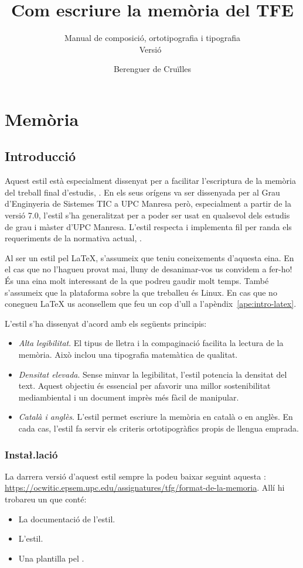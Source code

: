 \documentclass{tfgitic}
\title{
  Com escriure la memòria del TFE
}
\subtitle{
  Manual de composició, ortotipografia i tipografia\\
  Versió~\classversion{}
}
\author{Berenguer de Cruïlles}
\begin{document}
\part{Memòria}

\chapter{Introducció}
\label{cap:intro}

Aquest estil està especialment dissenyat per a facilitar l'escriptura de
la memòria del treball final d'estudis, . En els seus
orígens va ser dissenyada per al Grau d'Enginyeria de Sistemes TIC a
UPC Manresa però, especialment a partir de la versió 7.0, l'estil s'ha
generalitzat per a poder ser usat en qualsevol dels estudis de grau i
màster d'UPC Manresa. L'estil respecta i implementa fil per randa els
requeriments de la normativa actual,
\cite{manresa23:_normat_trebal_fi_estud_epsem}.

Al ser un estil pel \LaTeX{}, s'assumeix que teniu coneixements
d'aquesta eina. En el cas que no l'hagueu provat mai, lluny de
desanimar-vos us convidem a fer-ho!  És una eina molt interessant de
la que podreu gaudir molt temps. També s'assumeix que la plataforma
sobre la que treballeu és Linux. En cas que no conegueu \LaTeX{} us
aconsellem que feu un cop d'ull a l'apèndix~\ref{ape:intro-latex}.

L'estil s'ha dissenyat d'acord amb els següents principis:
\begin{itemize}
\item \emph{Alta legibilitat}. El tipus de lletra i la compaginació
  facilita la lectura de la memòria. Això inclou una tipografia
  matemàtica de qualitat.
\item \emph{Densitat elevada}. Sense minvar la legibilitat, l'estil
  potencia la densitat del text. Aquest objectiu és essencial per
  afavorir una millor sostenibilitat mediambiental i un document
  imprès més fàcil de manipular.
\item \emph{Català i anglès}. L'estil permet escriure la memòria en
  català o en anglès. En cada cas, l'estil fa servir els criteris
  ortotipogràfics propis de llengua emprada.
\end{itemize}


\section{Insta\l.lació}

La darrera versió d'aquest estil sempre la podeu baixar seguint
aquesta :
\url{https://ocwitic.epsem.upc.edu/assignatures/tfg/format-de-la-memoria}. Allí
hi trobareu un  que conté:
\begin{itemize}
\item La documentació de l'estil.
\item L'estil.
\item Una plantilla pel .
\end{itemize}
\end{document}
